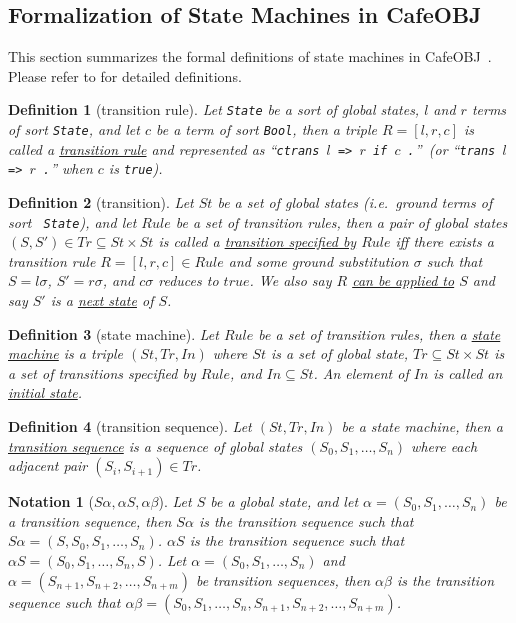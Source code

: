 \documentclass[12pt]{report}
\newtheorem{notation}{Notation}
\newtheorem{definition}{Definition}
\newcommand{\stt}[1]{{\small{\tt {#1}}}}
\newcommand{\ul}{\underline}
\newcommand{\cafeobj}{{\sf CafeOBJ}~}
\begin{document}
\subsection{Formalization of State Machines in \cafeobj}
\label{sec:statemachine}
This section summarizes the formal definitions of state machines in
\cafeobj. Please refer to \cite{Futatsugi15} for detailed
definitions.
\begin{definition}[transition rule]
  Let {\tt State} be a sort of global states, $l$ and $r$ terms of
  sort {\tt State}, and let $c$ be a term of sort {\tt Bool}, then a
  triple $R = [l,r,c]$ is called a \ul{transition rule} and
  represented as ``\stt{ctrans $l$ => $r$ if $c$ .}''~(or ``\stt{trans
    $l$ => $r$ .}'' when $c$ is \stt{true}).
\end{definition}
\begin{definition}[transition]
  Let $\mathit{St}$ be a set of global states (i.e.\ ground terms of sort {\tt
    State}), and let $Rule$ be a set of transition rules, then a pair of
  global states $(S,S')\in \mathit{Tr}\subseteq \mathit{St}\times \mathit{St}$ is called a
  \ul{transition specified by} $Rule$ iff there exists a transition
  rule $R=[l,r,c]\in Rule$ and some ground substitution $\sigma$ such
  that $S=l\sigma$, $S'=r\sigma$, and $c\sigma$ reduces to $true$. We
  also say $R$ \ul{can be applied to} $S$ and say $S'$ is a \ul{next
    state} of $S$\!.
\end{definition}
\begin{definition}[state machine]
  Let $Rule$ be a set of transition rules, then a \ul{state machine}
  is a triple $(\mathit{St},\mathit{Tr},In)$ where $\mathit{St}$ is a set of global state,
  $\mathit{Tr}\subseteq \mathit{St}\times \mathit{St}$ is a set of transitions specified by
  $Rule$, and $In \subseteq \mathit{St}$. An element of $In$ is called an
  \ul{initial state}.
\end{definition}
\begin{definition}[transition sequence]
  Let $(\mathit{St},\mathit{Tr},In)$ be a state machine, then a \ul{transition sequence} is a
  sequence of global states $(\mathit{S_0},\mathit{S_1},\dots,\mathit{S_n})$ where each adjacent
  pair $(\mathit{S_i},\mathit{S_{i+1}}) \in \mathit{Tr}$. 
\end{definition}
\begin{notation}[$S\alpha,\alpha S,\alpha\beta$]
  Let $S$ be a global state, and let $\alpha=(\mathit{S_0},\mathit{S_1},\dots,\mathit{S_n})$ be a
  transition sequence, then \ul{$S\alpha$} is the transition sequence
  such that $S\alpha=(S,\mathit{S_0},\mathit{S_1},\dots,\mathit{S_n})$.  \ul{$\alpha S$} is the
  transition sequence such that $\alpha S=(\mathit{S_0},\mathit{S_1},\dots,\mathit{S_n},S)$.  Let
  $\alpha=(\mathit{S_0},\mathit{S_1},\dots,\mathit{S_n})$ and
  $\alpha=(\mathit{S_{n+1}},\mathit{S_{n+2}},\dots,\mathit{S_{n+m}})$ be transition sequences,
  then \ul{$\alpha\beta$} is the transition sequence such that
  $\alpha\beta=(\mathit{S_0},\mathit{S_1},\dots,\mathit{S_n},\mathit{S_{n+1}},\mathit{S_{n+2}},\dots,\mathit{S_{n+m}})$.
\end{notation}
\end{document}

